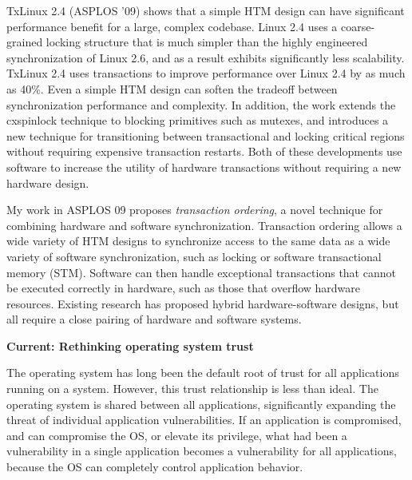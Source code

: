 \documentclass{article}
\newcommand{\codeid}[1]{{\fontsize{9pt}{12pt}\tt #1}}
\begin{document}
TxLinux 2.4 (ASPLOS ’09) shows that a simple HTM design can have
significant performance benefit for a large, complex codebase. Linux 2.4
uses a coarse-grained locking structure that is much simpler than the
highly engineered synchronization of Linux 2.6, and as a result exhibits
significantly less scalability. TxLinux 2.4 uses transactions to improve
performance over Linux 2.4 by as much as 40\%. Even a simple HTM design can
soften the tradeoff between synchronization performance and
complexity. In addition, the work extends the cxspinlock technique to
blocking primitives such as mutexes, and introduces a new technique for
transitioning between transactional and locking critical regions without
requiring expensive transaction restarts. Both of these developments use
software to increase the utility of hardware transactions without requiring
a new hardware design.

My work in ASPLOS 09 proposes \emph{transaction ordering}, a novel
technique for combining hardware and software synchronization. Transaction
ordering allows a wide variety of HTM designs to synchronize access to the
same data as a wide variety of software synchronization, such as locking or
software transactional memory (STM). Software can then handle exceptional
transactions that cannot be executed correctly in hardware, such as those
that overflow hardware resources. Existing research has proposed hybrid
hardware-software designs, but all require a close pairing of hardware and
software systems.


{\bigskip \noindent \bf Current: Rethinking operating system trust}

\noindent The operating system has long been the default root of trust for
all applications running on a system. However, this trust relationship is
less than ideal. The operating system is shared between all applications,
significantly expanding the threat of individual application
vulnerabilities. If an application is compromised, and can compromise the
OS, or elevate its privilege, what had been a vulnerability in a single
application becomes a vulnerability for all applications, because the OS
can completely control application behavior.

\end{document}
